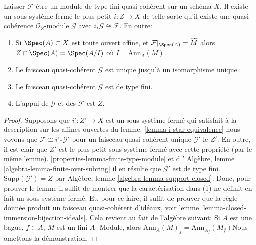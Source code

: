 \begin{lemma}

\label{lemma-scheme-theoretic-support}

Laisser $\mathcal{F}$ être un module de type fini quasi-cohérent sur un schéma $X$. Il existe un sous-système fermé le plus petit
$i : Z \to X$ de telle sorte qu'il existe une quasi-cohérence
$\mathcal{O}_Z$-module $\mathcal{G}$ avec
$i_*\mathcal{G} \cong \mathcal{F}$. En outre:

\begin{enumerate}

\item Si $\Spec(A) \subset X$ est toute ouvert affine, et
$\mathcal{F}|_{\Spec(A)} = \widetilde{M}$ alors
$Z \cap \Spec(A) = \Spec(A/I)$ où $I = \text{Ann}_A(M)$.
\item Le faisceau quasi-cohérent $\mathcal{G}$ est unique jusqu'à un isomorphisme unique.
\item Le faisceau quasi-cohérent $\mathcal{G}$ est de type fini.
\item L'appui de $\mathcal{G}$ et des $\mathcal{F}$ est $Z$.

\end{enumerate}

\end{lemma}

\begin{proof}

Supposons que $i' : Z' \to X$ est un sous-système fermé qui satisfait à la description sur les affines ouvertes du lemme. \ref{lemma-i-star-equivalence}
nous voyons que $\mathcal{F} \cong i'_*\mathcal{G}'$ pour un faisceau quasi-cohérent unique $\mathcal{G}'$ le $Z'$. En outre, il est clair que $Z'$ est le plus petit sous-système fermé avec cette propriété (par le même lemme). \ref{properties-lemma-finite-type-module}
et d ' Algèbre, lemme \ref{algebra-lemma-finite-over-subring}
il en résulte que $\mathcal{G}'$ est de type fini.
$\text{Supp}(\mathcal{G}') = Z$ par Algèbre, lemme \ref{algebra-lemma-support-closed}. Donc, pour prouver le lemme il suffit de montrer que la caractérisation dans (1) ne définit en fait un sous-système fermé. Et, pour ce faire, il suffit de prouver que la règle donnée produit un faisceau quasi-cohérent d'idéaux, voir lemme \ref{lemma-closed-immersion-bijection-ideals}. Cela revient au fait de l'algèbre suivant: Si $A$ est une bague, $f \in A$, $M$ est un fini $A$- Module, alors
$\text{Ann}_A(M)_f = \text{Ann}_{A_f}(M_f)$Nous omettons la démonstration.

\end{proof}

